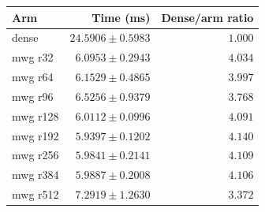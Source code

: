 \begin{tabular}{lrr}
\toprule
Arm & Time (ms) & Dense/arm ratio \\
\midrule
dense & $24.5906 \pm 0.5983$ & $1.000$ \\
mwg r32 & $6.0953 \pm 0.2943$ & $4.034$ \\
mwg r64 & $6.1529 \pm 0.4865$ & $3.997$ \\
mwg r96 & $6.5256 \pm 0.9379$ & $3.768$ \\
mwg r128 & $6.0112 \pm 0.0996$ & $4.091$ \\
mwg r192 & $5.9397 \pm 0.1202$ & $4.140$ \\
mwg r256 & $5.9841 \pm 0.2141$ & $4.109$ \\
mwg r384 & $5.9887 \pm 0.2008$ & $4.106$ \\
mwg r512 & $7.2919 \pm 1.2630$ & $3.372$ \\
\bottomrule
\end{tabular}
